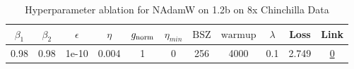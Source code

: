 \begin{table}[H]
\centering
\caption{Hyperparameter ablation for NAdamW on 1.2b on 8x Chinchilla Data}
\label{tab:ablation_nadamw_1.2b_on_8x_chinchilla_data}
\begin{tabular}{ccccccccccc}
\toprule
$\beta_1$ & $\beta_2$ & $\epsilon$ & $\eta$ & $g_{\mathrm{norm}}$ & $\eta_{min}$ & $\mathrm{BSZ}$ & $\mathrm{warmup}$ & $\lambda$ & Loss & Link \\
\midrule
0.98 & 0.98 & 1e-10 & 0.004 & 1 & 0 & 256 & 4000 & 0.1 & 2.749 & \href{https://wandb.ai/marin-community/optimizer-scaling/runs/sweep-1.2b-193B-nadamwa486b9lr0.004-wd0.1-minlr0.0-warmup4000-b1-563e6e}{0} \\
\midrule
\bottomrule
\end{tabular}
\end{table}

